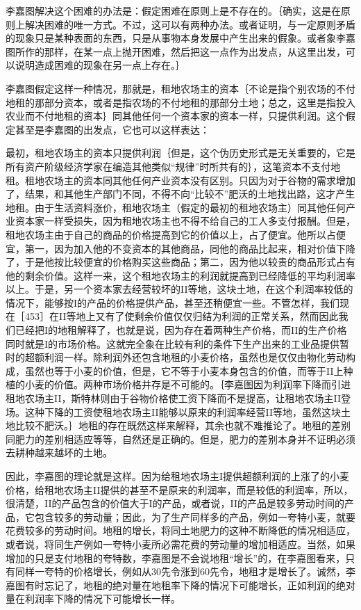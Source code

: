 李嘉图解决这个困难的办法是：假定困难在原则上是不存在的。｛确实，这是在原则上解决困难的唯一方式。不过，这可以有两种办法。或者证明，与一定原则矛盾的现象只是某种表面的东西，只是从事物本身发展中产生出来的假象。或者象李嘉图所作的那样，在某一点上抛开困难，然后把这一点作为出发点，从这里出发，可以说明造成困难的现象在另一点上存在。｝

李嘉图假定这样一种情况，那就是，租地农场主的资本｛不论是指个别农场的不付地租的那部分资本，或者是指农场的不付地租的那部分土地；总之，这里是指投入农业而不付地租的资本｝同其他任何一个资本家的资本一样，只提供利润。这个假定甚至是李嘉图的出发点，它也可以这样表达：

最初，租地农场主的资本只提供利润｛但是，这个伪历史形式是无关重要的，它是所有资产阶级经济学家在编造其他类似“规律”时所共有的｝，这笔资本不支付地租。租地农场主的资本同其他任何产业资本没有区别。只因为对于谷物的需求增加了，结果，和其他生产部门不同，不得不向“比较不”肥沃的土地找出路，这才产生地租。由于生活资料涨价，租地农场主（假定的最初的租地农场主）同其他任何产业资本家一样受损失，因为租地农场主也不得不给自己的工人多支付报酬。但是，租地农场主由于自己的商品的价格提高到它的价值以上，占了便宜。他所以占便宜，第一，因为加入他的不变资本的其他商品，同他的商品比起来，相对价值下降了，于是他按比较便宜的价格购买这些商品；第二，因为他以较贵的商品形式占有他的剩余价值。这样一来，这个租地农场主的利润就提高到已经降低的平均利润率以上。于是，另一个资本家去经营较坏的II等地，这块土地，在这个利润率较低的情况下，能够按I的产品的价格提供产品，甚至还稍便宜一些。不管怎样，我们现在［453］在II等地上又有了使剩余价值仅仅归结为利润的正常关系，然而因此我们已经把I的地租解释了，也就是说，因为存在着两种生产价格，而II的生产价格同时就是I的市场价格。这就完全象在比较有利的条件下生产出来的工业品提供暂时的超额利润一样。除利润外还包含地租的小麦价格，虽然也是仅仅由物化劳动构成，虽然也等于小麦的价值，但是，它不等于小麦本身包含的价值，而等于II上种植的小麦的价值。两种市场价格并存是不可能的。｛李嘉图因为利润率下降而引进租地农场主II，斯特林则由于谷物价格使工资下降而不是提高，让租地农场主II登场。这种下降的工资使租地农场主II能够以原来的利润率经营II等地，虽然这块土地比较不肥沃。｝地租的存在既然这样来解释，其余也就不难推论了。地租的差别同肥力的差别相适应等等，自然还是正确的。但是，肥力的差别本身并不证明必须去耕种越来越坏的土地。

因此，李嘉图的理论就是这样。因为给租地农场主I提供超额利润的上涨了的小麦价格，给租地农场主II提供的甚至不是原来的利润率，而是较低的利润率，所以，很清楚，II的产品包含的价值大于I的产品，或者说，II的产品是较多劳动时间的产品，它包含较多的劳动量；因此，为了生产同样多的产品，例如一夸特小麦，就要花费较多的劳动时间。地租的增长，将同土地肥力的这种不断降低的情况相适应，或者说，将同生产例如一夸特小麦所必需花费的劳动量的增加相适应。当然，如果增加的只是支付地租的夸特数，李嘉图是不会说地租“增长”的，在李嘉图看来，只有同样一夸特的价格增长，例如从30先令涨到60先令，地租才是增长了。诚然，李嘉图有时忘记了，地租的绝对量在地租率下降的情况下可能增长，正如利润的绝对量在利润率下降的情况下可能增长一样。

